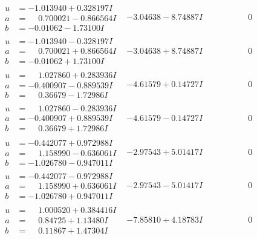 \documentclass[1p]{elsarticle_modified}
\theoremstyle{definition}
\begin{document}
$$\begin{array}{c|c|c}
\begin{aligned}
u &= -1.013940 + 0.328197 I \\
a &= \phantom{-}0.700021 - 0.866564 I \\
b &= -0.01062 - 1.73100 I\end{aligned}
 & -3.04638 - 8.74887 I & \phantom{-0.000000 } 0 \\ \hline\begin{aligned}
u &= -1.013940 - 0.328197 I \\
a &= \phantom{-}0.700021 + 0.866564 I \\
b &= -0.01062 + 1.73100 I\end{aligned}
 & -3.04638 + 8.74887 I & \phantom{-0.000000 } 0 \\ \hline\begin{aligned}
u &= \phantom{-}1.027860 + 0.283936 I \\
a &= -0.400907 - 0.889539 I \\
b &= \phantom{-}0.36679 - 1.72986 I\end{aligned}
 & -4.61579 + 0.14727 I & \phantom{-0.000000 } 0 \\ \hline\begin{aligned}
u &= \phantom{-}1.027860 - 0.283936 I \\
a &= -0.400907 + 0.889539 I \\
b &= \phantom{-}0.36679 + 1.72986 I\end{aligned}
 & -4.61579 - 0.14727 I & \phantom{-0.000000 } 0 \\ \hline\begin{aligned}
u &= -0.442077 + 0.972988 I \\
a &= \phantom{-}1.158990 - 0.636061 I \\
b &= -1.026780 - 0.947011 I\end{aligned}
 & -2.97543 + 5.01417 I & \phantom{-0.000000 } 0 \\ \hline\begin{aligned}
u &= -0.442077 - 0.972988 I \\
a &= \phantom{-}1.158990 + 0.636061 I \\
b &= -1.026780 + 0.947011 I\end{aligned}
 & -2.97543 - 5.01417 I & \phantom{-0.000000 } 0 \\ \hline\begin{aligned}
u &= \phantom{-}1.000520 + 0.384416 I \\
a &= \phantom{-}0.84725 + 1.13480 I \\
b &= \phantom{-}0.11867 + 1.47304 I\end{aligned}
 & -7.85810 + 4.18783 I & \phantom{-0.000000 } 0 \\ \hline\begin{aligned}

\end{aligned}
\end{array}$$
\end{document}
